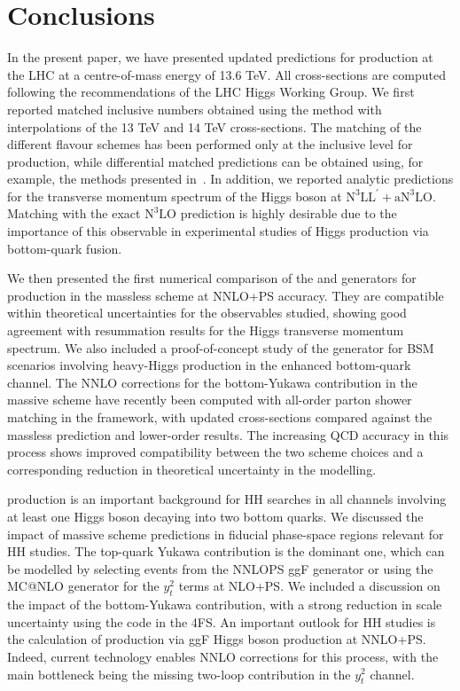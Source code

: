 \documentclass[11pt,a4paper]{article}
\begin{document}
\section{Conclusions}\label{sec:conclusions}
In the present paper, we have presented updated predictions for \bbH{} production at the LHC at a centre-of-mass energy of 13.6 TeV. All cross-sections are computed following the recommendations of the LHC Higgs Working Group. We first reported matched inclusive numbers obtained using the \nlonnllpart{} method with interpolations of the 13 TeV and 14 TeV cross-sections. The matching of the different flavour schemes has been performed only at the inclusive level for \bbH{} production, while differential matched predictions can be obtained using, for example, the methods presented in~. In addition, we reported analytic predictions for the transverse momentum spectrum of the Higgs boson at $\text{N}^3\text{LL}^{\prime}+\text{aN}^3\text{LO}$. Matching with the exact $\text{N}^3\text{LO}$ prediction is highly desirable due to the importance of this observable in experimental studies of Higgs production via bottom-quark fusion.

We then presented the first numerical comparison of the \minnlo{} and \GENEVA{} generators for \bbtoH{} production in the massless scheme at NNLO+PS accuracy. They are compatible within theoretical uncertainties for the observables studied, showing good agreement with resummation results for the Higgs transverse momentum spectrum. We also included a proof-of-concept study of the \minnlo{} generator for BSM scenarios involving heavy-Higgs production in the enhanced bottom-quark channel. The NNLO corrections for the bottom-Yukawa contribution in the massive scheme have recently been computed with all-order parton shower matching in the \minnlo{} framework, with updated cross-sections compared against the massless prediction and lower-order results. The increasing QCD accuracy in this process shows improved compatibility between the two scheme choices and a corresponding reduction in theoretical uncertainty in the \bbH{} modelling.

\bbH{} production is an important background for HH searches in all channels involving at least one Higgs boson decaying into two bottom quarks. We discussed the impact of massive scheme predictions in fiducial phase-space regions relevant for HH studies. The top-quark Yukawa contribution is the dominant one, which can be modelled by selecting events from the \textsc{NNLOPS} ggF generator or using the MC@NLO generator for the $y_t^2$ terms at NLO+PS. We included a discussion on the impact of the bottom-Yukawa contribution, with a strong reduction in scale uncertainty using the \minnlo{} code in the 4FS. An important outlook for HH studies is the calculation of \bbH{} production via ggF Higgs boson production at NNLO+PS. Indeed, current \minnlo{} technology enables NNLO corrections for this process, with the main bottleneck being the missing two-loop contribution in the $y_t^2$ channel.
\end{document}
